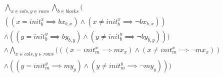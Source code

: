 \begin{multline} \label{eq:propInitial}
	\bigwedge_{x \in cols, y \in rows} \bigwedge_{b \in blocks} \bigg(\\  
		((x = init_b^x \implies bx_{b,x}) 
			\wedge (x \neq init_b^x \implies \neg bx_{b,x})) \\  
		\wedge ((y = init_b^y \implies by_{b,y}) 
			\wedge (y \neq init_b^y \implies \neg by_{b,y})) \bigg)\\  
	\wedge \bigwedge_{x \in cols, y \in rows} \Big(
		((x = init_m^x \implies mx_x) 
			\wedge (x \neq init_m^x \implies \neg mx_x)) \\  
		\wedge ((y = init_m^y \implies my_y) 
			\wedge (y \neq init_m^y \implies \neg my_y))
	\Big)
\end{multline}